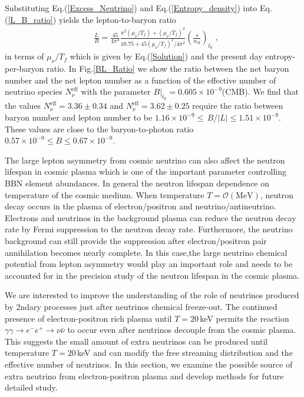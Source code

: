 Substituting Eq.\;(\ref{Excess_Neutrino}) and Eq.\;(\ref{Entropy_density}) into Eq.\;(\ref{L_B_ratio}) yields the lepton-to-baryon ratio
\begin{align}\label{L_B_ratio_final}
&\frac{L}{B}=\frac{45}{4\pi^4}\frac{\pi^2(\mu_\nu/T_f)+(\mu_\nu/T_f)^3}{10.75+{45}(\mu_\nu/T_f)^2/{4\pi^2}}\left(\frac{s}{n_B}\right)_{\!\!t_0}\;,
\end{align}
in terms of $\mu_\nu/T_f$ which is given by Eq.(\ref{Solution}) and the present day entropy-per-baryon ratio. In Fig.\;\ref{BL_Ratio} we show the ratio between the net baryon number and the net lepton number as a function of the effective number of neutrino species $N^{\mathrm{eff}}_\nu$ with the parameter $ B|_{t_0} =0.605\times 10^{-9}$(CMB). We find that the values $N_\nu^{\mathrm{eff}}=3.36\pm0.34$ and $N_\nu^{\mathrm{eff}}= 3.62\pm0.25$ require the ratio between baryon number and lepton number to be $1.16 \times 10^{-9} \leqslant\, B/|L| \leqslant 1.51\times 10^{-9}$. These values are close to the baryon-to-photon ratio $0.57 \times 10^{-9} \leqslant B  \leqslant 0.67\times 10^{-9}$. 


The large lepton asymmetry from cosmic neutrino can also affect the neutron lifespan in cosmic plasma which is one of the important parameter controlling BBN element abundances. 
In general the neutron lifespan dependence on temperature of the cosmic medium. When temperature $T=\mathcal{O}(\mathrm{MeV})$, neutron decay occurs in the plasma of electron/positron and 
 neutrino/antineutrino. Electrons and neutrinos in the background plasma can reduce the neutron decay rate by Fermi suppression to the neutron decay rate. Furthermore, the neutrino background can still provide the suppression after electron/positron pair annihilation becomes nearly complete. In this case,the large neutrino chemical potential from lepton asymmetry would play an important role and needs to be accounted for in the precision study of the neutron lifespan in the cosmic plasma.

 
We are interested to improve the understanding of the role of neutrinos produced by 2ndary processes just after neutrinos chemical freeze-out. The continued presence of electron-positron rich plasma until $T=20$\,keV permits the reaction $\gamma\gamma\to e^-e^+\to\nu\bar{\nu}$ to occur even after neutrinos decouple from the cosmic plasma. This suggests the small amount of extra neutrinos can be produced until temperature $T=20$\,keV and can modify the free streaming distribution and the effective number of neutrinos. In this section, we examine the possible source of extra neutrino from electron-positron plasma and develop methods for
future detailed study.

